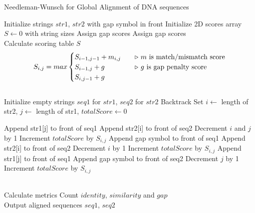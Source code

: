 \documentclass{article}
\begin{document}
\begin{algorithm}
\caption{Needleman-Wunsch for Global Alignment of DNA sequences}
\begin{algorithmic}[1]
\State Initialize strings $str1$, $str2$ with gap symbol in front
\State Initialize 2D scores array $S\gets 0$ with string sizes
	\State Assign gap scores 
\EndFor
{}
	\State Assign gap scores 
\EndFor
\\
 \Comment Calculate scoring table $S$
		\State 
		\[ S_{i,j} = max
  			\begin{cases}
    			S_{i-1,j-1}+m_{i,j} & \quad  \text{\Comment $m$ is match/mismatch score}\\
    			S_{i-1,j}+g & \quad  \text{\Comment $g$ is gap penalty score}\\
    			S_{i,j-1}+g\\
  			\end{cases}
		\]
	\EndFor
\EndFor
\\
\State Initialize empty strings $seq1$ for $str1$, $seq2$ for $str2$ \Comment Backtrack
\State Set $i\gets$ length of str2, $j\gets$ length of str1, $totalScore\gets 0$

		\State Append str1[j] to front of seq1
		\State Append str2[i] to front of seq2
		\State Decrement $i$ and $j$ by 1
		\State Increment $totalScore$ by \(S_{i,j}\)
		\State Append gap symbol to front of seq1
		\State Append str2[i] to front of seq2
		\State Decrement $i$ by 1
		\State Increment $totalScore$ by \(S_{i,j}\)
		\State Append str1[j] to front of seq1
		\State Append gap symbol to front of seq2
		\State Decrement $j$ by 1
		\State Increment $totalScore$ by \(S_{i,j}\)
	\EndIf

\EndWhile
\\
 \Comment Calculate metrics
	\State Count $identity$, $similarity$ and $gap$
\EndFor
\\
\State Output aligned sequences $seq1$, $seq2$

\end{algorithmic}
\end{algorithm}
\end{document}
